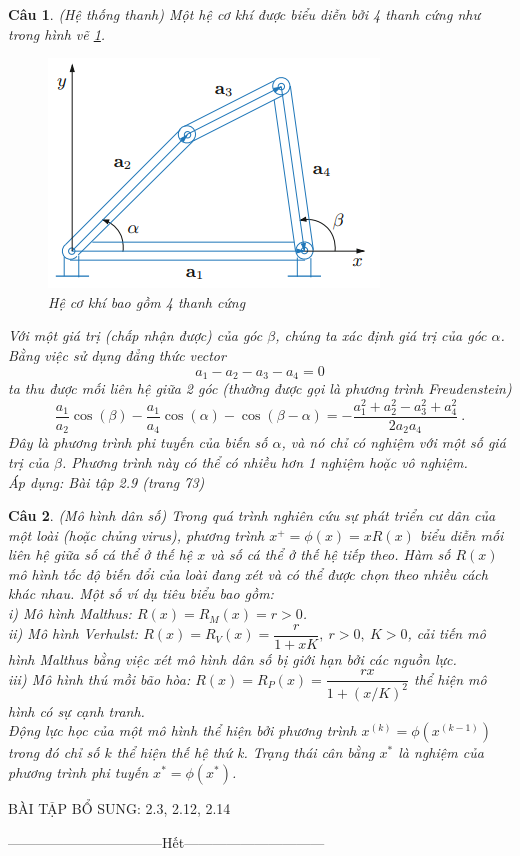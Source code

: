 \documentclass[answers]{exam}
\newtheorem{bt}{Câu}
\begin{document}
\begin{bt} (Hệ thống thanh) Một hệ cơ khí được biểu diễn bởi 4 thanh cứng như trong hình vẽ \ref{fig:lec11}. 
	\begin{figure}[!h]
		\centering
		\includegraphics[width=0.3\linewidth]{Lec1_1.png}
		\caption{Hệ cơ khí bao gồm 4 thanh cứng}
		\label{fig:lec11}
	\end{figure}	
Với một giá trị (chấp nhận được) của góc $\beta$, chúng ta xác định giá trị của góc $\alpha$. Bằng việc sử dụng đẳng thức vector
%
\[
a_1 - a_2 - a_3 -a_4 = 0
\]
%
ta thu được mối liên hệ giữa 2 góc (thường được gọi là phương trình Freudenstein)
%
\[
\dfrac{a_1}{a_2} \cos(\beta) - \dfrac{a_1}{a_4} \cos(\alpha) - \cos(\beta - \alpha) =  - \dfrac{a_1^2 + a_2^2 - a_3^2 + a_4^2}{2 a_2 a_4} \ .
\]
%
Đây là phương trình phi tuyến của biến số $\alpha$, và nó chỉ có nghiệm với một số giá trị của $\beta$. Phương trình này có thể có nhiều hơn 1 nghiệm hoặc vô nghiệm. \\
Áp dụng: Bài tập 2.9 (trang 73)	
\end{bt}

\begin{bt} (Mô hình dân số) Trong quá trình nghiên cứu sự phát triển cư dân của một loài (hoặc chủng virus), phương trình $x^+ = \phi(x) = xR(x)$ biểu diễn mối liên hệ giữa số cá thể ở thế hệ $x$ và số cá thể ở thế hệ tiếp theo. 
	Hàm số $R(x)$ mô hình tốc độ biến đổi của loài đang xét và có thể được chọn theo nhiều cách khác nhau. Một số ví dụ tiêu biểu bao gồm: \\
	i) Mô hình Malthus: $R(x) = R_M(x) = r > 0$. \\
	ii) Mô hình Verhulst: $R(x) = R_V(x) = \dfrac{r}{1+xK}, \ r > 0, \ K>0$, cải tiến mô hình Malthus bằng việc xét mô hình dân số bị giới hạn bởi các nguồn lực. \\
	iii) Mô hình thú mồi bão hòa: $R(x) = R_P(x) = \dfrac{rx}{1+(x/K)^2}$ thể hiện mô hình có sự cạnh tranh. \\
Động lực học của một mô hình thể hiện bởi phương trình $x^{(k)} = \phi(x^{(k-1)})$ trong đó chỉ số $k$ thể hiện thế hệ thứ k. Trạng thái cân bằng $x^*$ là nghiệm của phương trình phi tuyến $x^*= \phi(x^*)$.	
\end{bt}

\begin{center}
BÀI TẬP BỔ SUNG: 2.3, 2.12, 2.14
\end{center}


\centerline{———————————Hết——————————}

% 
   
\end{document}
